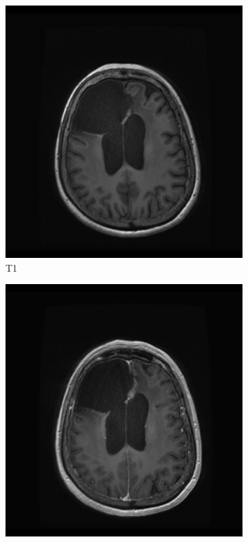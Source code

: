 \begin{figure}
\centering

\newlength{\figexamplewidth}
\setlength{\figexamplewidth}{0.22\textwidth}

\begin{subfigure}[t]{\figexamplewidth}
    \centering
    \includegraphics[width=\textwidth]{Figures/T1}
    \caption{\gls{T1}}\label{fig:T1}
\end{subfigure}
\begin{subfigure}[t]{\figexamplewidth}
    \centering
    \includegraphics[width=\textwidth]{Figures/T1GD}

\end{subfigure}
\end{figure}
